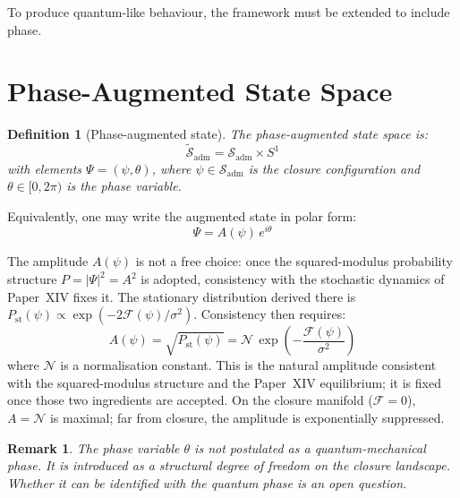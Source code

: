 \documentclass[12pt]{article}
\newtheorem{definition}[theorem]{Definition}
\newtheorem{remark}[theorem]{Remark}
\newcommand{\Fcal}{\mathcal{F}}
\newcommand{\Sadm}{\mathcal{S}_{\mathrm{adm}}}
\begin{document}
To produce quantum-like behaviour, the framework must be extended to include phase.

\section{Phase-Augmented State Space}\label{sec:phase}

\begin{definition}[Phase-augmented state]\label{def:augmented}
The phase-augmented state space is:
\begin{equation}
    \tilde{\mathcal{S}}_{\mathrm{adm}} = \Sadm \times S^1
\end{equation}
with elements $\Psi = (\psi, \theta)$, where $\psi \in \Sadm$ is the closure configuration and $\theta \in [0, 2\pi)$ is the phase variable.
\end{definition}

Equivalently, one may write the augmented state in polar form:
\begin{equation}\label{eq:polar}
    \Psi = A(\psi)\, e^{i\theta}
\end{equation}

The amplitude $A(\psi)$ is not a free choice: once the squared-modulus probability structure $P = |\Psi|^2 = A^2$ is adopted, consistency with the stochastic dynamics of Paper~XIV fixes it. The stationary distribution derived there is $P_{\mathrm{st}}(\psi) \propto \exp(-2\Fcal(\psi)/\sigma^2)$. Consistency then requires:
\begin{equation}\label{eq:amplitude}
    A(\psi) = \sqrt{P_{\mathrm{st}}(\psi)} = \mathcal{N}\, \exp\!\left(-\frac{\Fcal(\psi)}{\sigma^2}\right)
\end{equation}
where $\mathcal{N}$ is a normalisation constant. This is the natural amplitude consistent with the squared-modulus structure and the Paper~XIV equilibrium; it is fixed once those two ingredients are accepted. On the closure manifold ($\Fcal = 0$), $A = \mathcal{N}$ is maximal; far from closure, the amplitude is exponentially suppressed.

\begin{remark}
The phase variable $\theta$ is not postulated as a quantum-mechanical phase. It is introduced as a structural degree of freedom on the closure landscape. Whether it can be identified with the quantum phase is an open question.
\end{remark}
\end{document}

